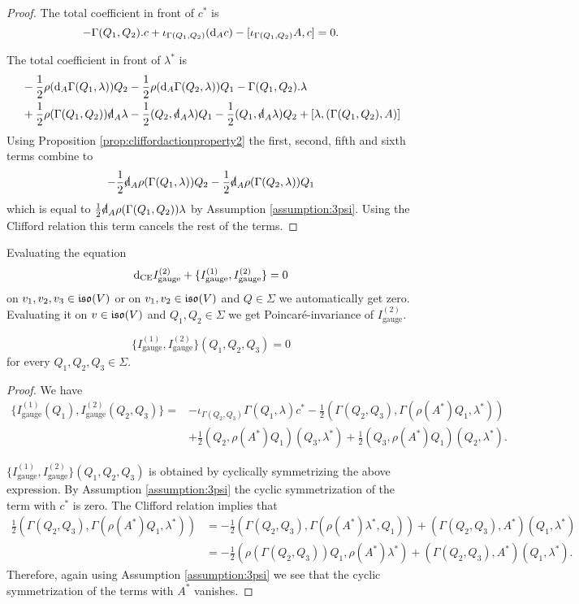\documentclass[10pt, oneside]{article}
\newcommand{\gauge}{\mathrm{gauge}}
\begin{document}
\begin{proof}
The total coefficient in front of $c^*$ is
\[-\Gamma(Q_1, Q_2).c + \iota_{\Gamma(Q_1, Q_2)}({\rm d}_A c) - [\iota_{\Gamma(Q_1, Q_2)} A, c] = 0.\]

The total coefficient in front of $\lambda^*$ is
\begin{align*}
&-\frac{1}{2}\rho(\d_A \Gamma(Q_1, \lambda))Q_2 -\frac{1}{2}\rho(\d_A \Gamma(Q_2, \lambda))Q_1 - \Gamma(Q_1, Q_2).\lambda \\
&+ \frac{1}{2}\rho(\Gamma(Q_1, Q_2))\sd{\d}_A\lambda - \frac{1}{2}(Q_2, \sd{\d}_A\lambda) Q_1 -\frac{1}{2}(Q_1, \sd{\d}_A\lambda) Q_2 + [\lambda, (\Gamma(Q_1, Q_2), A)]
\end{align*}
Using Proposition \ref{prop:cliffordactionproperty2} the first, second, fifth and sixth terms combine to
\[-\frac{1}{2} \sd{\d}_A\rho(\Gamma(Q_1, \lambda))Q_2 - \frac{1}{2} \sd{\d}_A\rho(\Gamma(Q_2, \lambda)) Q_1\]
which is equal to $\frac{1}{2} \sd{\d}_A \rho(\Gamma(Q_1, Q_2))\lambda$ by Assumption \ref{assumption:3psi}. Using the Clifford relation this term cancels the rest of the terms.
\end{proof}

Evaluating the equation
\[\d_{\mr{CE}} I_{\gauge}^{(2)} + \{I_{\gauge}^{(1)}, I_{\gauge}^{(2)}\} = 0\]
on $v_1, v_2, v_3\in\mathfrak{iso}(V)$ or on $v_1, v_2\in\mathfrak{iso}(V)$ and $Q\in\Sigma$ we automatically get zero. Evaluating it on $v\in\mathfrak{iso}(V)$ and $Q_1, Q_2\in\Sigma$ we get Poincar\'{e}-invariance of $I_{\gauge}^{(2)}$.

\begin{lemma}
\[\{I_{\gauge}^{(1)}, I_{\gauge}^{(2)}\}(Q_1, Q_2, Q_3) = 0\]
for every $Q_1, Q_2, Q_3\in\Sigma$.
\label{lm:gaugemultiplet3}
\end{lemma}
\begin{proof}
We have
\begin{align*}
\{I_{\gauge}^{(1)}(Q_1), I_{\gauge}^{(2)}(Q_2, Q_3)\} = &-\iota_{\Gamma(Q_2, Q_3)}\Gamma(Q_1, \lambda) c^* - \frac{1}{2} (\Gamma(Q_2, Q_3), \Gamma(\rho(A^*) Q_1, \lambda^*)) \\
&+ \frac{1}{2}(Q_2, \rho(A^*)Q_1)(Q_3, \lambda^*) + \frac{1}{2}(Q_3, \rho(A^*) Q_1)(Q_2, \lambda^*).
\end{align*}

$\{I_{\gauge}^{(1)}, I_{\gauge}^{(2)}\}(Q_1, Q_2, Q_3)$ is obtained by cyclically symmetrizing the above expression. By Assumption \ref{assumption:3psi} the cyclic symmetrization of the term with $c^*$ is zero. The Clifford relation implies that
\begin{align*}
\frac{1}{2} (\Gamma(Q_2, Q_3), \Gamma(\rho(A^*) Q_1, \lambda^*)) &= -\frac{1}{2}(\Gamma(Q_2, Q_3), \Gamma(\rho(A^*)\lambda^*, Q_1)) + (\Gamma(Q_2, Q_3), A^*) (Q_1, \lambda^*) \\
&= -\frac{1}{2}(\rho(\Gamma(Q_2, Q_3)) Q_1, \rho(A^*)\lambda^*) + (\Gamma(Q_2, Q_3), A^*) (Q_1, \lambda^*).
\end{align*}
Therefore, again using Assumption \ref{assumption:3psi} we see that the cyclic symmetrization of the terms with $A^*$ vanishes.
\end{proof}
\end{document}
